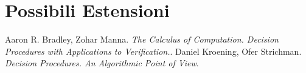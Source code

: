 \documentclass[a4paper, 11pt]{article}
\begin{document}
\section*{Possibili Estensioni}

\begin{thebibliography}{2}
 Aaron R. Bradley, Zohar Manna. \emph{The Calculus of Computation. Decision Procedures with Applications to Verification.}.
  Daniel Kroening, Ofer Strichman. \emph{Decision Procedures. An Algorithmic Point of View}.
\end{thebibliography}
\end{document}
